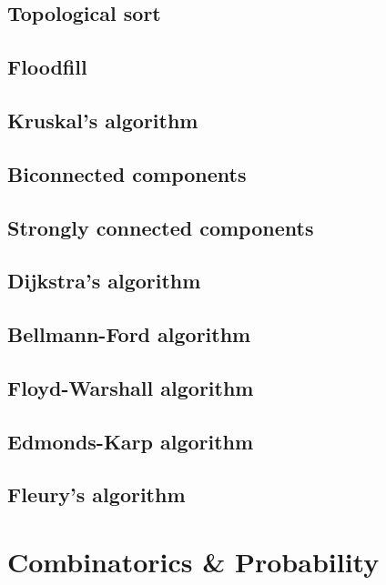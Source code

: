 \documentclass[a4paper]{article}
\begin{document}
    \subsection{Topological sort}
    
    \subsection{Floodfill}
    
    \subsection{Kruskal's algorithm}
    
    \subsection{Biconnected components}
    
    \subsection{Strongly connected components}
    
    \subsection{Dijkstra's algorithm}
    
    \subsection{Bellmann-Ford algorithm}
    
    \subsection{Floyd-Warshall algorithm}
    
    \subsection{Edmonds-Karp algorithm}
    
    \subsection{Fleury's algorithm}
    
  \section{Combinatorics \& Probability}
  
\end{document}
